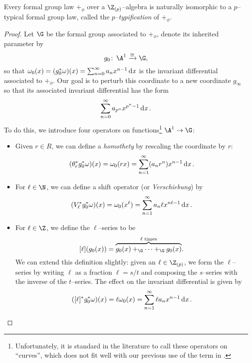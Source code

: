 \begin{lemma}\label{EveryLogHaspTypification}\label{EveryFGLIsPTypical}
Every formal group law \(+_\phi\) over a \(\Z_{(p)}\)--algebra is naturally isomorphic to a \(p\)--typical formal group law, called the \textit{\(p\)--typification} of \(+_\phi\).
\end{lemma}
\begin{proof}
Let \(\G\) be the formal group associated to \(+_\phi\), denote its inherited parameter by \[g_0\co \A^1 \xrightarrow{\cong} \G,\] so that \(\omega_0(x) = (g_0^* \omega)(x) = \sum_{n=0}^\infty a_n x^{n-1} \operatorname{d\mathit{x}}\) is the invariant differential associated to \(+_\phi\).  Our goal is to perturb this coordinate to a new coordinate \(g_\infty\) so that its associated invariant differential has the form \[\sum_{n=0}^\infty a_{p^n} x^{p^n-1} \operatorname{d\mathit{x}}.\]  To do this, we introduce four operators on functions\footnote{Unfortunately, it is standard in the literature to call these operators on ``curves'', which does not fit well with our previous use of the term in .} \(\A^1 \to \G\):
\begin{itemize}
\item Given \(r \in R\), we can define a \textit{homothety} by rescaling the coordinate by \(r\): \[(\theta_r^* g_0^* \omega)(x) = \omega_0(rx) = \sum_{n=1}^\infty (a_n r^n) x^{n-1} \operatorname{d\mathit{x}}.\]
\item For \(\ell \in \N\), we can define a shift operator (or \textit{Verschiebung}) by \[(V_\ell^* g_0^* \omega)(x) = \omega_0(x^\ell) = \sum_{n=1}^\infty a_n \ell x^{n \ell - 1} \operatorname{d\mathit{x}}.\]
\item For \(\ell \in \Z\), we define the \(\ell\)--series to be \[[\ell](g_0(x)) = \overset{\text{\(\ell\) times}}{\overbrace{g_0(x) +_{\G} \cdots +_{\G} g_0(x)}}.\]  We can extend this definition slightly: given an \(\ell \in \Z_{(p)}\), we form the \(\ell\)--series by writing \(\ell\) as a fraction \(\ell = s/t\) and composing the \(s\)--series with the inverse of the \(t\)--series.  The effect on the invariant differential is given by \[([\ell]^* g_0^* \omega)(x) = \ell \omega_0(x) = \sum_{n=1}^\infty \ell a_n x^{n-1} \operatorname{d\mathit{x}}.\]

\end{itemize}
\end{proof}
